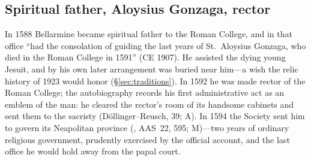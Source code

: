 
\subsection{Spiritual father, Aloysius Gonzaga, rector}

In 1588 Bellarmine became spiritual father to the Roman College, and
in that office ``had the consolation of guiding the last years of
St.~Aloysius Gonzaga, who died in the Roman College in 1591''
(CE 1907). He assisted the dying young Jesuit, and by his own later
arrangement was buried near him---a wish the relic history of 1923
would honor (\S\ref{sec:traditions}). In 1592 he was made rector of
the Roman College; the autobiography records his first
administrative act as an emblem of the man: he cleared the rector's
room of its handsome cabinets and sent them to the sacristy
(D\"ollinger--Reusch, 39; A). In 1594 the Society sent him to govern
its Neapolitan province (, AAS~22, 595; M)---two
years of ordinary religious government, prudently exercised by the
official account, and the last office he would hold away from the
papal court.
